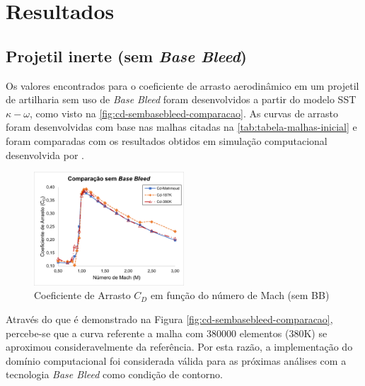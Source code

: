 \chapter{Resultados}\label{cap:resultados}
\graphicspath{{chapter-07/img-cap07/}}

\section{Projetil inerte (sem \textit{Base Bleed})}\label{sec:resultados-sem-basebleed}

Os valores encontrados para o coeficiente de arrasto aerodinâmico em um projetil de artilharia sem uso de \textit{Base Bleed} foram desenvolvidos a partir do modelo SST \(\kappa-\omega\), como visto na \autoref{fig:cd-sembasebleed-comparacao}. As curvas de arrasto foram desenvolvidas com base nas malhas citadas na \autoref{tab:tabela-malhas-inicial} e foram comparadas com os resultados obtidos em simulação computacional desenvolvida por \citeauthor{Mahmoud2009}. 

\begin{figure}[!ht]
	\centering
	\includegraphics[width=0.5\textwidth]{cd-sembasebleed-comparacao.png}
	\caption{Coeficiente de Arrasto \(C_{D}\) em função do número de Mach (sem BB)}
	\label{fig:cd-sembasebleed-comparacao}
\end{figure}

Através do que é demonstrado na Figura \autoref{fig:cd-sembasebleed-comparacao}, percebe-se que a curva referente a malha com \num{380000} elementos (380K) se aproximou consideravelmente da referência. Por esta razão, a implementação do domínio computacional foi considerada válida para as próximas análises com a tecnologia \textit{Base Bleed} como condição de contorno.

